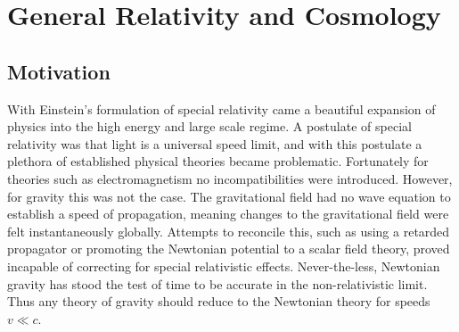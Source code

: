 \chapter{General Relativity and Cosmology}
\section{Motivation}
With Einstein's formulation of special relativity came a beautiful expansion of physics into the high energy and large scale regime. A postulate of special relativity was that light is a universal speed limit, and with this postulate a plethora of established physical theories became problematic. Fortunately for theories such as electromagnetism no incompatibilities were introduced. However, for gravity this was not the case. The gravitational field had no wave equation to establish a speed of propagation, meaning changes to the gravitational field were felt instantaneously globally. Attempts to reconcile this, such as using a retarded propagator or promoting the Newtonian potential to a scalar field theory, proved incapable of correcting for special relativistic effects. Never-the-less, Newtonian gravity has stood the test of time to be accurate in the non-relativistic limit. Thus any theory of gravity should reduce to the Newtonian theory for speeds $v \ll c$.

